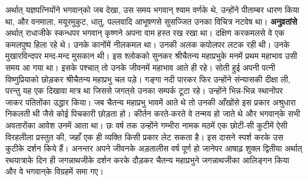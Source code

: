 \begin{sloppypar}\justifying{}
अर्थात् यज्ञपत्नियोंने भगवान्‌को जब देखा, उस समय भगवान् श्याम वर्णके थे, उन्होंने पीताम्बर धारण किया था, और वनमाला, मयूर\-मुकुट, धातु, पल्लवादि आभूषणसे सुसज्जित उनका विचित्र नटवेष था। \textbf{अनुव्रतांसे} अर्थात् राधाजीके स्कन्धपर भगवान् कृष्णने अपना वाम हस्त रख रखा था। दक्षिण करकमलसे वे एक कमलपुष्प हिला रहे थे। उनके कानोंमें नीलकमल था। उनकी अलक कपोलपर लटक रही थी। उनके मुखारविन्दपर मन्द-मन्द मुसकान थी। इस श्लोकको सुनकर श्रीचैतन्य महाप्रभुके मनमें प्रथम महाभाव उसी समय आ गया था। इसके पश्चात् तो उनके जीवनमें महाभाव आते ही रहे। सोती हुई अपनी पत्नी विष्णुप्रियाको छोड़कर श्रीचैतन्य महाप्रभु चल पड़े। गङ्गा नदी पारकर फिर उन्होंने संन्यासकी दीक्षा ली, परन्तु यह एक दिखावा मात्र था जिससे जगत्‌से उनका सम्पर्क टूटा रहे। उन्होंने भिन्न-भिन्न स्थानोंपर जाकर पतितोंका उद्धार किया। जब चैतन्य महाप्रभु भावमें आते थे तो उनकी आँखोंसे इस प्रकार अश्रुधारा निकलती थी जैसे कोई पिचकारी छोड़ता हो। कीर्तन करते-करते वे तन्मय हो जाते थे और भगवान्‌के सभी अवतारोंका आवेश उनमें आता था। छः वर्ष तक उन्होंने गम्भीरा नामक मठमें एक छोटी-सी कुटीमें ऐसी विरहलीला प्रस्तुत की, जहाँ एक ही व्यक्ति किसी प्रकार लेट सकता है। इस दासने स्पर्श करके उस कुटीके दर्शन किये हैं। अनन्तर अपने जीवनके अड़तालीस वर्ष पूर्ण हो जानेपर आषाढ़ शुक्ल द्वितीया अर्थात् रथयात्राके दिन ही जगन्नाथजीके दर्शन करके दौड़कर चैतन्य महाप्रभुने जगन्नाथजीका आलिङ्गन किया और वे भगवान्‌के विग्रहमें समा गए।
\end{sloppypar}


